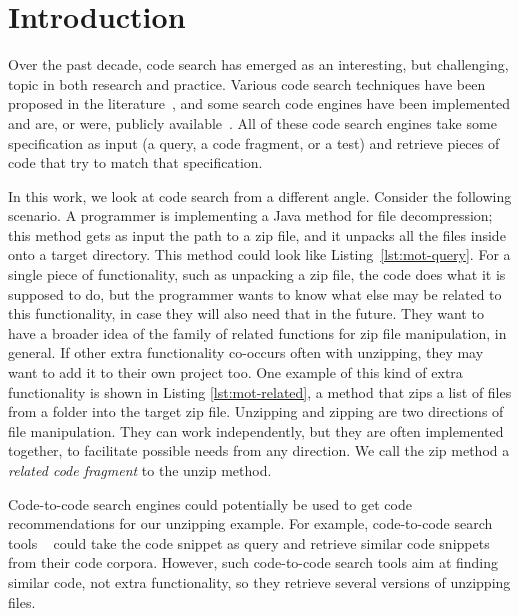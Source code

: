 \section{Introduction}
\label{sec:intro}

Over the past decade, code search has emerged as an interesting, but
challenging, topic in both research and practice. Various code search
techniques have been proposed in the
literature~\cite{sourcerer,reiss:icse2009,codegenie,exemplar:tse:2011}, and
some search code engines have been implemented and are, or were, publicly
available~\cite{google_code_search,github,codase,krugle,ohloh,searchcode}. All
of these code search engines take some specification as input (a
query, a code fragment, or a test) and retrieve pieces of code that try
to match that specification.


In this work, we look at code search from a different angle. Consider
the following scenario. A programmer is implementing a Java method for
file decompression; this method gets as input the path to a zip file,
and it unpacks all the files inside onto a target directory. This
method could look like Listing~\ref{lst:mot-query}. For a single piece
of functionality, such as unpacking a zip file, the code does what it
is supposed to do, but the programmer wants to know what else may be
related to this functionality, in case they will also need that in the
future. They want to have a broader idea of the family of related
functions for zip file manipulation, in general. If other extra
functionality co-occurs often with unzipping, they may want to add it
to their own project too. One example of this kind of extra
functionality is shown in Listing \ref{lst:mot-related}, a method that
zips a list of files from a folder into the target zip file. Unzipping
and zipping are two directions of file manipulation. They can work
independently, but they are often implemented together, to facilitate
possible needs from any direction. We call the zip method a
\textit{related code fragment} to the unzip method.



Code-to-code search engines could potentially be used to get code
recommendations for our unzipping example. For example, code-to-code search tools
~\cite{kim2018Facoy, krugle, searchcode} could take the code snippet
as query and retrieve similar code snippets from their code
corpora. However, such code-to-code search tools aim at finding
similar code, not extra functionality, so they retrieve several
versions of unzipping files. 


